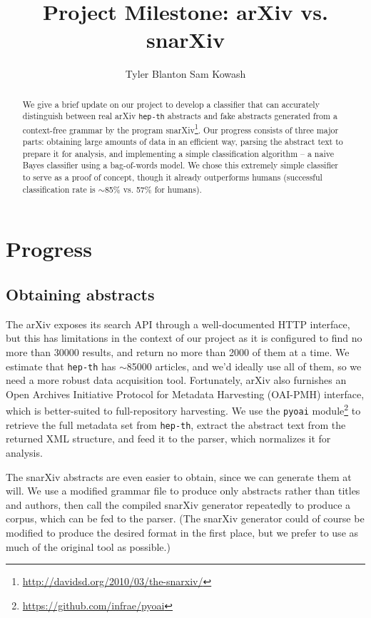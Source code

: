 \documentclass{article}
\title{Project Milestone: arXiv vs. snarXiv}
\author{Tyler Blanton \And Sam Kowash}
\begin{document}

\maketitle

\begin{abstract}
  We give a brief update on our project to develop a classifier that can accurately distinguish between real arXiv \texttt{hep-th} abstracts and fake abstracts generated from a context-free grammar by the program snarXiv\footnote{\url{http://davidsd.org/2010/03/the-snarxiv/}}.
  Our progress consists of three major parts: obtaining large amounts of data in an efficient way, parsing the abstract text to prepare it for analysis, and implementing a simple classification algorithm -- a naive Bayes classifier using a bag-of-words model.
  We chose this extremely simple classifier to serve as a proof of concept, though it already outperforms humans (successful classification rate is $\sim$85\% vs. 57\% for humans).
\end{abstract}




\section{Progress}
\label{sec:progress}
\subsection{Obtaining abstracts}
The arXiv exposes its search API through a well-documented HTTP interface, but this has limitations in the context of our project as it is configured to find no more than 30000 results, and return no more than 2000 of them at a time.
We estimate that \texttt{hep-th} has $\sim$85000 articles, and we'd ideally use all of them, so we need a more robust data acquisition tool.
Fortunately, arXiv also furnishes an Open Archives Initiative Protocol for Metadata Harvesting (OAI-PMH) interface, which is better-suited to full-repository harvesting. We use the \texttt{pyoai} module\footnote{\url{https://github.com/infrae/pyoai}} to retrieve the full metadata set from \texttt{hep-th}, extract the abstract text from the returned XML structure, and feed it to the parser, which normalizes it for analysis.

The snarXiv abstracts are even easier to obtain, since we can generate them at will.
We use a modified grammar file to produce only abstracts rather than titles and authors, then call the compiled snarXiv generator repeatedly to produce a corpus, which can be fed to the parser.
(The snarXiv generator could of course be modified to produce the desired format in the first place, but we prefer to use as much of the original tool as possible.)
\end{document}
